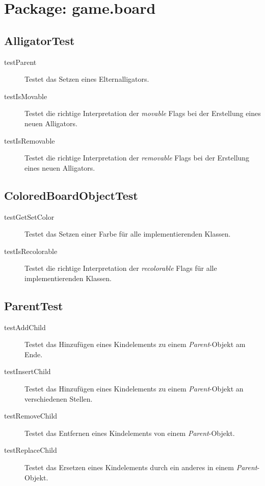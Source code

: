 \section{Package: game.board}

\subsection{AlligatorTest}
\begin{description}
\item[testParent]
Testet das Setzen eines Elternalligators.

\item[testIsMovable]
Testet die richtige Interpretation der \emph{movable} Flags bei der Erstellung eines neuen Alligators.

\item[testIsRemovable]
Testet die richtige Interpretation der \emph{removable} Flags bei der Erstellung eines neuen Alligators.

\end{description}

\subsection{ColoredBoardObjectTest}
\begin{description}
\item[testGetSetColor]
Testet das Setzen einer Farbe für alle implementierenden Klassen.

\item[testIsRecolorable]
Testet die richtige Interpretation der \emph{recolorable} Flags für alle implementierenden Klassen.

\end{description}

\subsection{ParentTest}
\begin{description}
\item[testAddChild]
Testet das Hinzufügen eines Kindelements zu einem \emph{Parent}-Objekt am Ende.

\item[testInsertChild]
Testet das Hinzufügen eines Kindelements zu einem \emph{Parent}-Objekt an verschiedenen Stellen.

\item[testRemoveChild]
Testet das Entfernen eines Kindelements von einem \emph{Parent}-Objekt.

\item[testReplaceChild]
Testet das Ersetzen eines Kindelements durch ein anderes in einem \emph{Parent}-Objekt.

\end{description}
